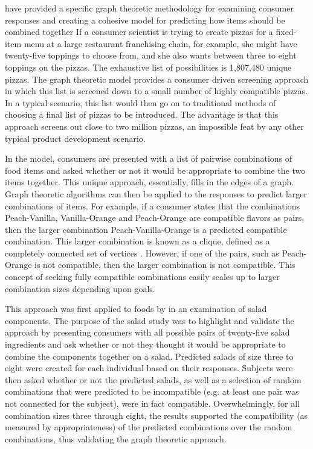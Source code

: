 \citet{Ennisa} have provided a specific graph theoretic methodology for examining consumer responses and creating a cohesive model for predicting how items should be combined together If a consumer scientist is trying to create pizzas for a fixed-item menu at a large restaurant franchising chain, for example, she might have twenty-five toppings to choose from, and she also wants between three to eight toppings on the pizzas.  The exhaustive list of possibilities is 1,807,480 unique pizzas.  The graph theoretic model provides a consumer driven screening approach \citep{Ennis2011} in which this list is screened down to a small number of highly compatible pizzas.  In a typical scenario, this list would then go on to traditional methods of choosing a final list of pizzas to be introduced.  The advantage is that this approach screens out close to two million pizzas, an impossible feat by any other typical product development scenario.  

In the \citet{Ennisa} model, consumers are presented with a list of pairwise combinations of food items and asked whether or not it would be appropriate to combine the two items together.  This unique approach, essentially, fills in the edges of a graph.  Graph theoretic algorithms can then be applied to the responses to predict larger combinations of items.  For example, if a consumer states that the combinations Peach-Vanilla, Vanilla-Orange and Peach-Orange are compatible flavors as pairs, then the larger combination Peach-Vanilla-Orange is a predicted compatible combination.  This larger combination is known as a clique, defined as a completely connected set of vertices \citep{Moon1965}.  However, if one of the pairs, such as Peach-Orange is not compatible, then the larger combination is not compatible.  This concept of seeking fully compatible combinations easily scales up to larger combination sizes depending upon goals.  

This approach was first applied to foods by \citet{Nestrud2010a} in an examination of salad components.  The purpose of the salad study was to highlight and validate the \citet{Ennis2010} approach by presenting consumers with all possible pairs of twenty-five salad ingredients and ask whether or not they thought it would be appropriate to combine the components together on a salad.  Predicted salads of size three to eight were created for each individual based on their responses.  Subjects were then asked whether or not the predicted salads, as well as a selection of random combinations that were predicted to be incompatible (e.g. at least one pair was not connected for the subject), were in fact compatible.  Overwhelmingly, for all combination sizes three through eight, the results supported the compatibility (as measured by appropriateness) of the predicted combinations over the random combinations, thus validating the graph theoretic approach.

